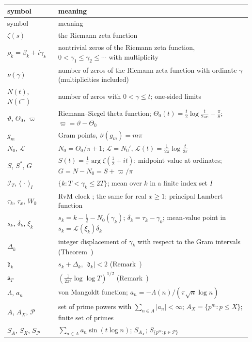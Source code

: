 \documentclass[preprint,12pt]{elsarticle}
\makeatletter
\let\CG@origref\ref
\let\CG@origeqref\eqref
\newcommand{\CG@gettip}[1]{\@ifundefined{CGTip@#1}{Reference: #1}{\csname CGTip@#1\endcsname}}
\DeclareRobustCommand{\CGref}[1]{\pdftooltip{\CG@origref{#1}}{\CG@gettip{#1}}}
\DeclareRobustCommand{\CGeqref}[1]{\pdftooltip{\CG@origeqref{#1}}{\CG@gettip{#1}}}
\numberwithin{equation}{section}
\theoremstyle{plain}
\theoremstyle{definition}
\theoremstyle{remark}
\newcommand{\NO}{N_0}
\newcommand{\lL}{\mathcal L}
\newcommand{\IT}{\mathcal I_T}
\newcommand{\PP}{\mathcal P}
\makeatother
\begin{document}
\begin{center}
\small
\begin{longtable}{p{}p{}}
\toprule
symbol & meaning\\
\midrule
\endfirsthead
\toprule
symbol & meaning\\
\midrule
\endhead
\bottomrule
\endfoot
$\zeta(s)$ & the Riemann zeta function\\
$\rho_k=\beta_k+i\gamma_k$ & nontrivial zeros of the Riemann zeta function, $0<\gamma_1\le\gamma_2\le\cdots$ with multiplicity\\
$\nu(\gamma)$ & number of zeros of the Riemann zeta function with ordinate $\gamma$ (multiplicities included)\\
$N(t)$, $N(t^\pm)$ & number of zeros with $0<\gamma\le t$; one-sided limits\\
$\vartheta$, $\Theta_0$, $\varpi$ & Riemann--Siegel theta function; $\Theta_0(t)=\frac t2\log\frac t{2\pi e}-\frac\pi8$; $\varpi=\vartheta-\Theta_0$\\
$g_m$ & Gram points, $\vartheta(g_m)=m\pi$\\
$\NO$, $\lL$ & $\NO=\Theta_0/\pi+1$; $\lL=\NO'$, $\lL(t)=\frac1{2\pi}\log\frac t{2\pi}$\\
$S$, $S^*$, $G$ & $S(t)=\frac1\pi\arg\zeta(\frac12+it)$; midpoint value at ordinates; $G=N-\NO=S+\varpi/\pi$\\
$\IT$, $\langle\,\cdot\,\rangle_I$ & $\{k:T<\gamma_k\le2T\}$; mean over $k$ in a finite index set $I$\\
$\tau_k$, $\tau_x$, $W_0$ & RvM clock \CGeqref{eq:clock}; the same for real $x\ge1$; principal Lambert function\\
$s_k$, $\delta_k$, $\xi_k$ & $s_k=k-\frac12-\NO(\gamma_k)$; $\delta_k=\tau_k-\gamma_k$; mean-value point in $s_k=\lL(\xi_k)\delta_k$\\
$\Delta_k$ & integer displacement of $\gamma_k$ with respect to the Gram intervals (Theorem~\CGref{thm:known_korolev})\\
$\mathfrak d_k$ & $s_k+\Delta_k$, $|\mathfrak d_k|<2$ (Remark~\CGref{rem:korolev})\\
$\mathfrak s_T$ & $(\frac1{2\pi^2}\log\log T)^{1/2}$ (Remark~\CGref{rem:korolev})\\
$\Lambda$, $a_n$ & von Mangoldt function; $a_n=-\Lambda(n)/(\pi\sqrt n\log n)$\\
$A$, $A_X$, $\PP$ & set of prime powers with $\sum_{n\in A}|a_n|<\infty$; $A_X=\{p^m:p\le X\}$; finite set of primes\\
$S_A$, $S_X$, $S_\PP$ & $\sum_{n\in A}a_n\sin(t\log n)$; $S_{A_X}$; $S_{\{p^m:p\in\PP\}}$\\

\end{longtable}
\end{center}
\end{document}
